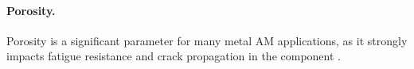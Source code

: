 \paragraph{Porosity.} Porosity is a significant parameter for many metal AM applications, as it strongly impacts fatigue resistance and crack propagation in the component \cite{edwards_electron_2013}. 
\begin{figure}
    \centering
    \qquad
\end{figure}
